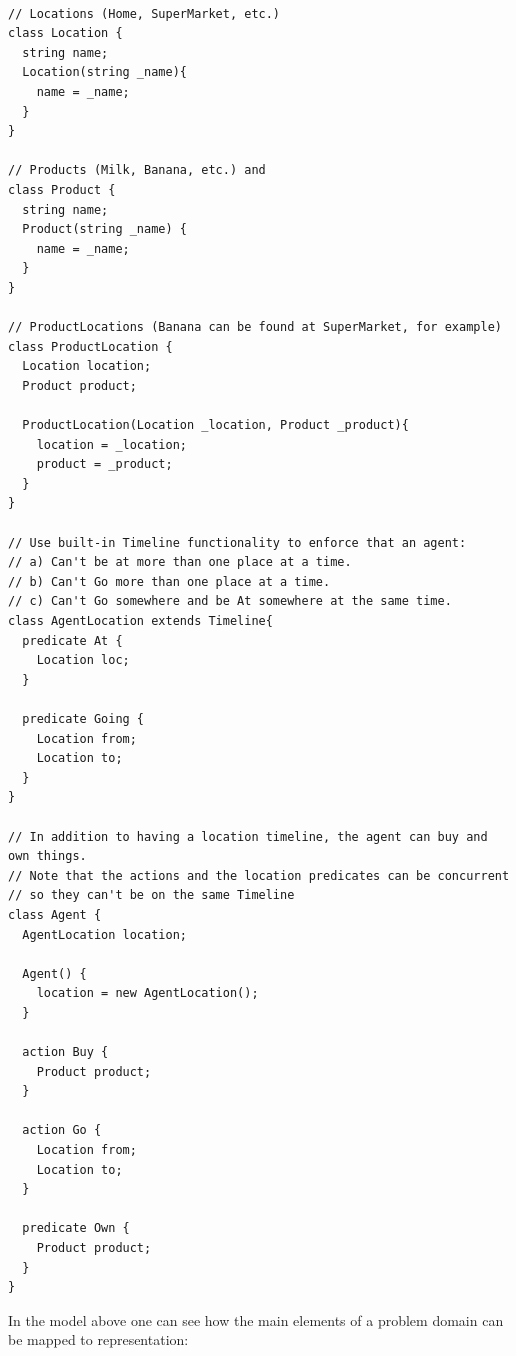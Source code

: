 \begin{verbatim}

// Locations (Home, SuperMarket, etc.)
class Location {
  string name;
  Location(string _name){
    name = _name;
  }
}

// Products (Milk, Banana, etc.) and
class Product {
  string name;
  Product(string _name) {
    name = _name;
  }
}

// ProductLocations (Banana can be found at SuperMarket, for example)
class ProductLocation {
  Location location;
  Product product;

  ProductLocation(Location _location, Product _product){
    location = _location;
    product = _product;
  }
}

// Use built-in Timeline functionality to enforce that an agent:
// a) Can't be at more than one place at a time.
// b) Can't Go more than one place at a time.
// c) Can't Go somewhere and be At somewhere at the same time.
class AgentLocation extends Timeline{
  predicate At {
    Location loc;
  }

  predicate Going {
    Location from;
    Location to;
  }
}

// In addition to having a location timeline, the agent can buy and own things.  
// Note that the actions and the location predicates can be concurrent 
// so they can't be on the same Timeline
class Agent {
  AgentLocation location;

  Agent() {
    location = new AgentLocation();
  }

  action Buy {
    Product product;
  }
  
  action Go {
    Location from;
    Location to;
  }
  
  predicate Own {
  	Product product;
  }
}
\end{verbatim}

In the model above one can see how the main elements of a problem domain
can be mapped to \eus representation:

